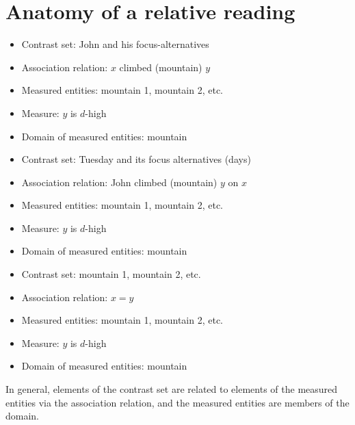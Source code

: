 \documentclass{article}
\begin{document}
\section{Anatomy of a relative reading}


\begin{itemize}
\item Contrast set: John and his focus-alternatives
\item Association relation: $x$ climbed (mountain) $y$
\item Measured entities: mountain 1, mountain 2, etc.
\item Measure: $y$ is $d$-high 
\item Domain of measured entities: mountain
\end{itemize}

\begin{itemize}
\item Contrast set: Tuesday and its focus alternatives (days)
\item Association relation: John climbed (mountain) $y$ on $x$
\item Measured entities: mountain 1, mountain 2, etc.
\item Measure: $y$ is $d$-high
\item Domain of measured entities: mountain
\end{itemize}



\begin{itemize}
\item Contrast set: mountain 1, mountain 2, etc.
\item Association relation: $x=y$
\item Measured entities: mountain 1, mountain 2, etc.
\item Measure: $y$ is $d$-high
\item Domain of measured entities: mountain
\end{itemize}


In general, elements of the contrast set are related to elements of
the measured entities via the association relation, and the measured
entities are members of the domain.
\end{document}
